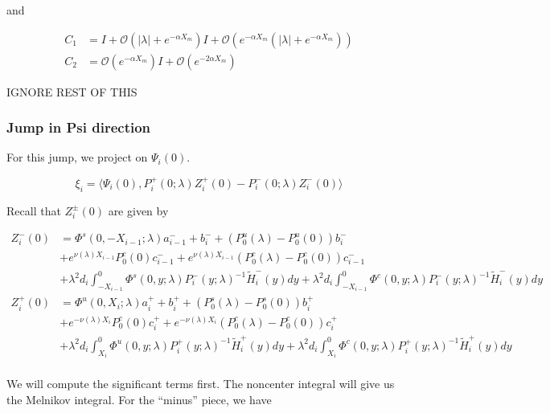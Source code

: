 \documentclass[12pt]{article}
\begin{document}
and

\begin{align*}
C_1 &= I + \mathcal{O}(|\lambda| + e^{-\alpha X_m}) I 
+ \mathcal{O}(e^{-\alpha X_m}( |\lambda| + e^{-\alpha X_m}))\\
C_2 &= \mathcal{O}(e^{-\alpha X_m}) I + \mathcal{O}(e^{-2 \alpha X_m})
\end{align*}

IGNORE REST OF THIS

\subsubsection*{Jump in Psi direction}

For this jump, we project on $\Psi_i(0)$.

\[
\xi_i = \langle \Psi_i(0), P_i^+(0; \lambda) Z_i^+(0) - P_i^-(0; \lambda) Z_i^-(0) \rangle
\]

Recall that $Z_i^\pm(0)$ are given by

\begin{align*}
Z_i^-(0) &= \Phi^s(0, -X_{i-1}; \lambda) a_{i-1}^- + b_i^- + (P_0^u(\lambda) - P_0^u(0))b_i^- \\
&+ e^{\nu(\lambda) X_{i-1}} P_0^c(0) c_{i-1}^- + e^{\nu(\lambda) X_{i-1}} (P_0^c(\lambda) - P_0^c(0))c_{i-1}^- \\
&+ \lambda^2 d_i \int_{-X_{i-1}}^0 \Phi^s(0, y; \lambda) P_i^-(y; \lambda)^{-1} \tilde{H}_i^-(y) dy 
+ \lambda^2 d_i \int_{-X_{i-1}}^0 \Phi^c(0, y; \lambda) P_i^-(y; \lambda)^{-1} \tilde{H}_i^-(y) dy  \\ 
Z_i^+(0) &= \Phi^u(0, X_i; \lambda) a_i^+ + b_i^+ + (P_0^s(\lambda) - P_0^s(0)) b_i^+ \\
&+ e^{-\nu(\lambda)X_i} P_0^c(0) c_i^+ + e^{-\nu(\lambda)X_i} (P_0^c(\lambda) - P_0^c(0))c_i^+ \\
&+ \lambda^2 d_i \int_{X_i}^0 \Phi^u(0, y; \lambda) P_i^+(y; \lambda)^{-1} \tilde{H}_i^+(y) dy 
+ \lambda^2 d_i \int_{X_i}^0 \Phi^c(0, y; \lambda) P_i^+(y; \lambda)^{-1} \tilde{H}_i^+(y) dy \\
\end{align*}

We will compute the significant terms first. The noncenter integral will give us the Melnikov integral. For the ``minus'' piece, we have
\end{document}
